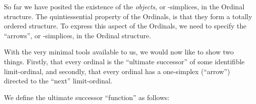 \documentclass[a4paper]{amsart}
\begin{document}
So far we have posited the existence of the \emph{objects}, or \zero-simplices,
in the Ordinal structure. The quintiessential property of the Ordinals, is that
they form a totally ordered structure. To express this aspect of the Ordinals,
we need to specify the ``arrows'', or \one-simplices, in the Ordinal structure.

\begin{deAxiom}
\hypothesis{\Gamma}{\judgement{\alpha}{\Ordinal}}
\conclusion{\Gamma}{
  \judgement{\arrow{\alpha}{\successor{\alpha}}}{\Ordinal}
}
\end{deAxiom}

\begin{deAxiom}
\conclusion{}{
  \judgement{\arrow{\zero}{\limitOrd{\zero}}}{\Ordinal}
}
\end{deAxiom}

\begin{deAxiom}
\hypothesis{\Gamma}{\judgement{\alpha}{\Ordinal}}
\conclusion{\Gamma}{
  \judgement{\arrow{\limitOrd{\alpha}}{\limitOrd{\successor{\alpha}}}}{\Ordinal}
}
\end{deAxiom}

\begin{deAxiom}
\hypothesis{\Gamma}{\judgement{\alpha}{\Ordinal}}
\hypothesis{\Gamma}{\judgement{\beta}{\Ordinal}}
\hypothesis{\Gamma}{\judgement{\arrow{\alpha}{\limitOrd{\beta}}}{\Ordinal}}
\conclusion{\Gamma}{
  \judgement{\arrow{\successor{\alpha}}{\limitOrd{\beta}}}{\Ordinal}
}
\end{deAxiom}


With the very minimal tools available to us, we would now like to show two
things.  Firstly, that every ordinal is the ``ultimate successor'' of some
identifible limit-ordinal, and secondly, that every ordinal has a one-simplex
(``arrow'') directed to the ``next'' limit-ordinal.

We define the ultimate successor ``function'' as follows:

\begin{deAxiom}
\hypothesis{\Gamma}{\judgement{\alpha}{\Ordinal}}
\end{deAxiom}
\end{document}
